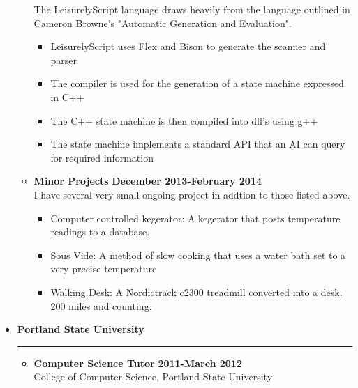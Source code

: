 \documentclass[overlapped]{res}
\begin{document}
\begin{resume}
\begin{itemize}[leftmargin=0in]
\begin{itemize}[leftmargin=0in]
\begin{samepage}
                    The LeisurelyScript language draws heavily from the language 
                    outlined in Cameron Browne's "Automatic Generation and Evaluation".
                    \begin{itemize}
                        \item[\textbullet] LeisurelyScript uses Flex and Bison to generate the scanner and parser
                        \item[\textbullet] The compiler is used for the generation of a state machine expressed in C++
                        \item[\textbullet] The C++ state machine is then compiled into dll's using g++
                        \item[\textbullet] The state machine implements a standard API that an AI can query for required information
                    \end{itemize}
                \end{samepage}
            \item[] 
                \begin{samepage}
                    \textbf{Minor Projects} \hfill \textbf{December 2013-February 2014} \\
                    I have several very small ongoing project in addtion to those listed above.
                    \begin{itemize}
                        \item[\textbullet] Computer controlled kegerator:  A kegerator that posts temperature readings to a database.
                        \item[\textbullet] Sous Vide:  A method of slow cooking that uses a water bath set to a very precise temperature
                        \item[\textbullet] Walking Desk:  A Nordictrack c2300 treadmill converted into a desk. 200 miles and counting.
                    \end{itemize}
                \end{samepage}
        \end{itemize}
\end{itemize}
\vspace{0.25in}

\begin{itemize}[leftmargin=0in]
    \item[] \textbf{Portland State University} \\[-0.1in] \rule{\textwidth}{0.5pt}
        \begin{itemize}[leftmargin=0in]
            \item[] 
                \begin{samepage}
                    \textbf{Computer Science Tutor} \hfill \textbf{2011-March 2012} \\
                    College of Computer Science, Portland State University \hfill


\end{samepage}
\end{itemize}
\end{itemize}
\end{resume}
\end{document}

